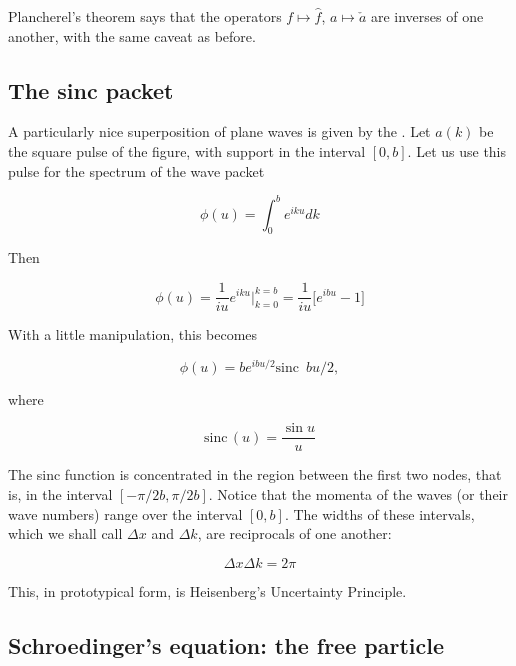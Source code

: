 Plancherel's theorem says that the operators $f\mapsto \hat f$, $a \mapsto \check a$ are inverses of one another, with the same caveat as before.

\subsection{The sinc packet}


A particularly nice superposition of plane waves is given by the .  Let $a(k)$ be the square pulse of the figure, with support in the interval $[0,b]$.  Let us use this pulse for the spectrum of the wave packet

\begin{equation}
\phi(u) = \int_0^b e^{iku} dk
\end{equation}

Then

\begin{equation}
\phi(u) = \frac{1}{iu} e^{iku} \Big\vert_{k=0}^{k=b} = 
\frac{1}{iu} \Big[  e^{ibu} - 1 \Big]
\end{equation}

With a little manipulation, this becomes

\begin{equation}
\phi(u) = be^{ibu/2}\text{sinc }\,bu/2,
\end{equation}

where 

\begin{equation}
\text{sinc}\,(u)= \frac{\sin u}{u}
\end{equation}

The sinc function is concentrated in the region between the first two nodes, that is, in the interval $[-\pi/2b, \pi/2b]$.  Notice that the momenta of the waves (or their wave numbers) range over the interval $[0,b]$.  The widths of these intervals, which we shall call $\Delta x$ and $\Delta k$, are reciprocals of one another:

\begin{equation}
\Delta x \Delta k =2 \pi
\end{equation}

This, in prototypical form, is Heisenberg's Uncertainty Principle.

\subsection{Schroedinger's equation: the free particle}

